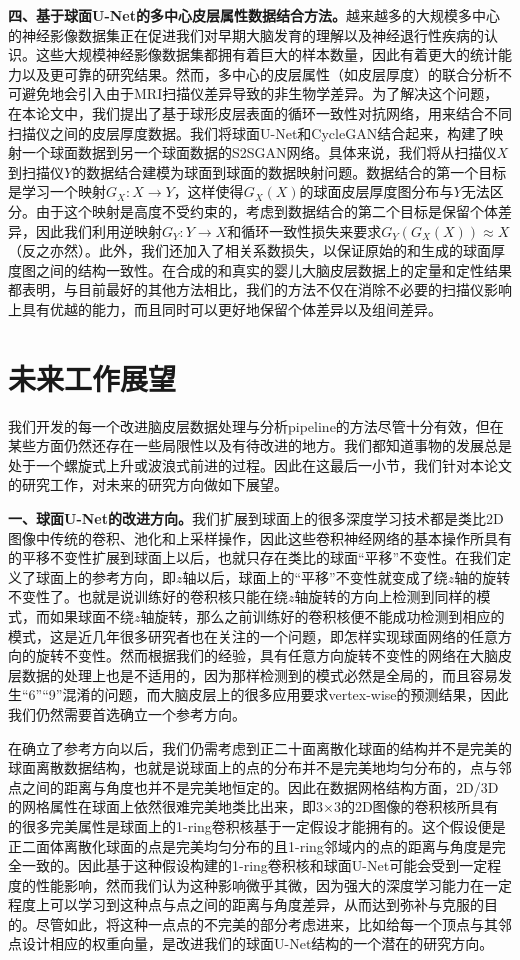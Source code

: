 \textbf{四、基于球面U-Net的多中心皮层属性数据结合方法。}越来越多的大规模多中心的神经影像数据集正在促进我们对早期大脑发育的理解以及神经退行性疾病的认识。这些大规模神经影像数据集都拥有着巨大的样本数量，因此有着更大的统计能力以及更可靠的研究结果。然而，多中心的皮层属性（如皮层厚度）的联合分析不可避免地会引入由于MRI扫描仪差异导致的非生物学差异。为了解决这个问题，在本论文中，我们提出了基于球形皮层表面的循环一致性对抗网络，用来结合不同扫描仪之间的皮层厚度数据。我们将球面U-Net和CycleGAN结合起来，构建了映射一个球面数据到另一个球面数据的S2SGAN网络。具体来说，我们将从扫描仪$X$到扫描仪$Y$的数据结合建模为球面到球面的数据映射问题。数据结合的第一个目标是学习一个映射$G_X:X\rightarrow Y$，这样使得$G_X(X)$的球面皮层厚度图分布与$Y$无法区分。由于这个映射是高度不受约束的，考虑到数据结合的第二个目标是保留个体差异，因此我们利用逆映射$G_Y:Y\rightarrow X$和循环一致性损失来要求$G_Y(G_X(X))\approx X$（反之亦然）。此外，我们还加入了相关系数损失，以保证原始的和生成的球面厚度图之间的结构一致性。在合成的和真实的婴儿大脑皮层数据上的定量和定性结果都表明，与目前最好的其他方法相比，我们的方法不仅在消除不必要的扫描仪影响上具有优越的能力，而且同时可以更好地保留个体差异以及组间差异。


\section{未来工作展望}
我们开发的每一个改进脑皮层数据处理与分析pipeline的方法尽管十分有效，但在某些方面仍然还存在一些局限性以及有待改进的地方。我们都知道事物的发展总是处于一个螺旋式上升或波浪式前进的过程。因此在这最后一小节，我们针对本论文的研究工作，对未来的研究方向做如下展望。

\textbf{一、球面U-Net的改进方向。}我们扩展到球面上的很多深度学习技术都是类比2D图像中传统的卷积、池化和上采样操作，因此这些卷积神经网络的基本操作所具有的平移不变性扩展到球面上以后，也就只存在类比的球面“平移”不变性。在我们定义了球面上的参考方向，即$z$轴以后，球面上的“平移”不变性就变成了绕$z$轴的旋转不变性了。也就是说训练好的卷积核只能在绕$z$轴旋转的方向上检测到同样的模式，而如果球面不绕$z$轴旋转，那么之前训练好的卷积核便不能成功检测到相应的模式，这是近几年很多研究者也在关注的一个问题\cite{esteves2018learning,cohen2018spherical,cohen2019gauge}，即怎样实现球面网络的任意方向的旋转不变性。然而根据我们的经验，具有任意方向旋转不变性的网络在大脑皮层数据的处理上也是不适用的，因为那样检测到的模式必然是全局的，而且容易发生“6”“9”混淆的问题，而大脑皮层上的很多应用要求vertex-wise的预测结果，因此我们仍然需要首选确立一个参考方向。

在确立了参考方向以后，我们仍需考虑到正二十面离散化球面的结构并不是完美的球面离散数据结构，也就是说球面上的点的分布并不是完美地均匀分布的，点与邻点之间的距离与角度也并不是完美地恒定的。因此在数据网格结构方面，2D/3D的网格属性在球面上依然很难完美地类比出来，即3$\times$3的2D图像的卷积核所具有的很多完美属性是球面上的1-ring卷积核基于一定假设才能拥有的。这个假设便是正二面体离散化球面的点是完美均匀分布的且1-ring邻域内的点的距离与角度是完全一致的。因此基于这种假设构建的1-ring卷积核和球面U-Net可能会受到一定程度的性能影响，然而我们认为这种影响微乎其微，因为强大的深度学习能力在一定程度上可以学习到这种点与点之间的距离与角度差异，从而达到弥补与克服的目的。尽管如此，将这种一点点的不完美的部分考虑进来，比如给每一个顶点与其邻点设计相应的权重向量，是改进我们的球面U-Net结构的一个潜在的研究方向。

